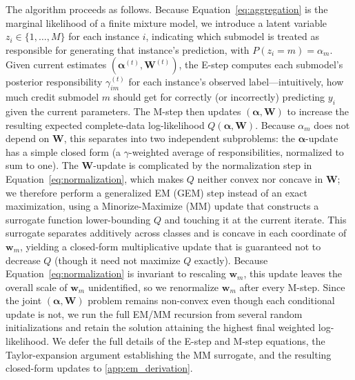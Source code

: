 \documentclass[11pt]{elsarticle}
\begin{document}
The algorithm proceeds as follows. Because Equation~\ref{eq:aggregation} is the marginal likelihood of a finite mixture model, we introduce a latent variable $z_i \in \{1, \ldots, M\}$ for each instance $i$, indicating which submodel is treated as responsible for generating that instance's prediction, with $P(z_i = m) = \alpha_m$. Given current estimates $(\bm{\alpha}^{(t)}, \bm{W}^{(t)})$, the E-step computes each submodel's posterior responsibility $\gamma_{im}^{(t)}$ for each instance's observed label---intuitively, how much credit submodel $m$ should get for correctly (or incorrectly) predicting $y_i$ given the current parameters. The M-step then updates $(\bm{\alpha}, \bm{W})$ to increase the resulting expected complete-data log-likelihood $Q(\bm{\alpha}, \bm{W})$. Because $\alpha_m$ does not depend on $\bm{W}$, this separates into two independent subproblems: the $\bm{\alpha}$-update has a simple closed form (a $\gamma$-weighted average of responsibilities, normalized to sum to one). The $\bm{W}$-update is complicated by the normalization step in Equation~\ref{eq:normalization}, which makes $Q$ neither convex nor concave in $\bm{W}$; we therefore perform a generalized EM (GEM) step instead of an exact maximization, using a Minorize-Maximize (MM) update \citep{hunterlange2004mm} that constructs a surrogate function lower-bounding $Q$ and touching it at the current iterate. This surrogate separates additively across classes and is concave in each coordinate of $\bm{w}_m$, yielding a closed-form multiplicative update that is guaranteed not to decrease $Q$ (though it need not maximize $Q$ exactly). Because Equation~\ref{eq:normalization} is invariant to rescaling $\bm{w}_m$, this update leaves the overall scale of $\bm{w}_m$ unidentified, so we renormalize $\bm{w}_m$ after every M-step. Since the joint $(\bm{\alpha}, \bm{W})$ problem remains non-convex even though each conditional update is not, we run the full EM/MM recursion from several random initializations and retain the solution attaining the highest final weighted log-likelihood. We defer the full details of the E-step and M-step equations, the Taylor-expansion argument establishing the MM surrogate, and the resulting closed-form updates to \ref{app:em_derivation}.
\end{document}
